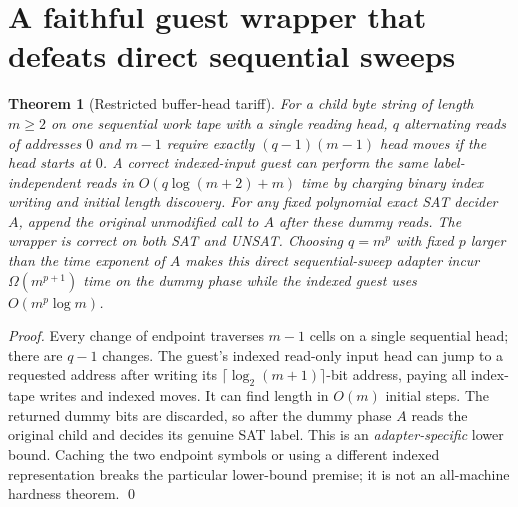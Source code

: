 \documentclass[11pt]{article}
\newtheorem{theorem}{Theorem}
\begin{document}
\section{A faithful guest wrapper that defeats direct sequential sweeps}
\begin{theorem}[Restricted buffer-head tariff]
For a child byte string of length $m\ge2$ on one sequential work tape with a single reading head, $q$ alternating reads of addresses $0$ and $m-1$ require exactly $(q-1)(m-1)$ head moves if the head starts at $0$. A correct indexed-input guest can perform the same label-independent reads in $O(q\log(m+2)+m)$ time by charging binary index writing and initial length discovery. For any fixed polynomial exact SAT decider $A$, append the original unmodified call to $A$ after these dummy reads. The wrapper is correct on both SAT and UNSAT. Choosing $q=m^p$ with fixed $p$ larger than the time exponent of $A$ makes this direct sequential-sweep adapter incur $\Omega(m^{p+1})$ time on the dummy phase while the indexed guest uses $O(m^p\log m)$.
\end{theorem}
\begin{proof}
Every change of endpoint traverses $m-1$ cells on a single sequential head; there are $q-1$ changes. The guest's indexed read-only input head can jump to a requested address after writing its $\lceil\log_2(m+1)\rceil$-bit address, paying all index-tape writes and indexed moves. It can find length in $O(m)$ initial steps. The returned dummy bits are discarded, so after the dummy phase $A$ reads the original child and decides its genuine SAT label. This is an \emph{adapter-specific} lower bound. Caching the two endpoint symbols or using a different indexed representation breaks the particular lower-bound premise; it is not an all-machine hardness theorem. \qed
\end{proof}
\end{document}
